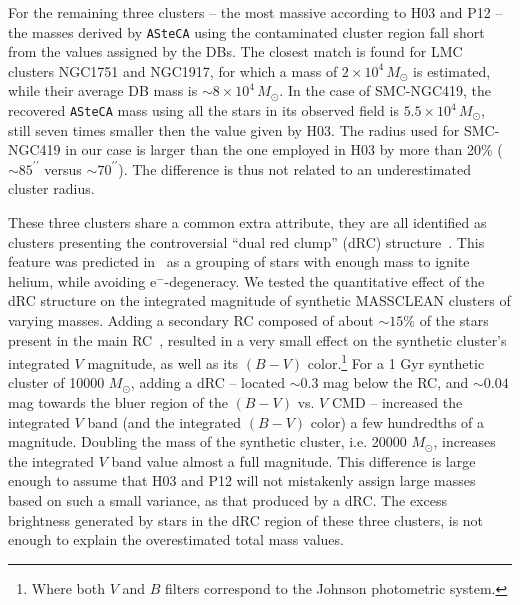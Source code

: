 \documentclass[referee]{aa}
\begin{document}
For the remaining three clusters -- the most massive according to H03 and P12 --
the masses derived by \texttt{ASteCA} using the contaminated cluster region fall
short from the values assigned by the DBs.
The closest match is found for LMC clusters NGC1751 and NGC1917, for which a
mass of $2{\times}10^4\,M_{\odot}$ is estimated, while their average DB mass is
${\sim}8{\times}10^4\,M_{\odot}$.
In the case of SMC-NGC419, the recovered \texttt{ASteCA} mass using all
the stars in its observed field is $5.5{\times}10^4\,M_{\odot}$, still
seven times smaller then the value given by H03. The radius used for SMC-NGC419
in our case is larger than the one employed in H03 by more than 20\%
(${\sim}85^{\prime\prime}$ versus ${\sim}70^{\prime\prime}$). The difference is
thus not related to an underestimated cluster radius.

These three clusters share a common extra attribute,
they are all identified as clusters presenting the controversial ``dual red
clump'' (dRC) structure~\citep{Girardi_2009}.
This feature was predicted in~\cite{Girardi_1998} as a grouping of stars with
enough mass to ignite helium, while avoiding e$^-$-degeneracy.
%
%
%
We tested the quantitative effect of the dRC structure on the integrated
magnitude of synthetic MASSCLEAN clusters of varying masses. Adding a secondary
RC composed of about ${\sim}15\%$ of the stars present
in the main RC~\citep[the approximate value found for SMC-NGC419 in][]
{Girardi_2009}, resulted in a very small effect on the synthetic cluster's
integrated $V$ magnitude, as well as its $(B-V)$ color.\footnote{Where both $V$
and $B$ filters correspond to the Johnson photometric system.}
%
For a 1 Gyr synthetic cluster of 10000 $M_{\odot}$, adding a dRC
-- located ${\sim}0.3$ mag below the RC, and ${\sim}0.04$ mag towards the bluer
region of the $(B-V)$ vs. $V$ CMD -- increased the integrated $V$ band (and
the integrated $(B-V)$ color) a few hundredths of a magnitude.
%
Doubling the mass of the synthetic cluster, i.e. 20000 $M_{\odot}$, increases
the integrated $V$ band value almost a full magnitude. This difference is large
enough to assume that H03 and P12 will not mistakenly assign large masses based
on such a small variance, as that produced by a dRC.\@
%
The excess brightness generated by stars in the dRC region of these three
clusters, is not enough to explain the overestimated total mass values.
\end{document}
